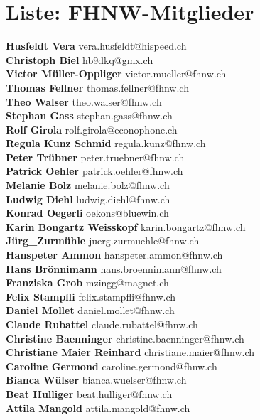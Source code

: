 \documentclass{scrartcl}
\begin{document}
\section*{Liste: FHNW-Mitglieder}
\textbf{Husfeldt Vera } vera.husfeldt@hispeed.ch\\
\textbf{Christoph Biel } hb9dkq@gmx.ch\\
\textbf{Victor Müller-Oppliger } victor.mueller@fhnw.ch\\
\textbf{Thomas Fellner } thomas.fellner@fhnw.ch\\
\textbf{Theo Walser } theo.walser@fhnw.ch\\
\textbf{Stephan Gass } stephan.gass@fhnw.ch\\
\textbf{Rolf Girola } rolf.girola@econophone.ch\\
\textbf{Regula Kunz Schmid } regula.kunz@fhnw.ch\\
\textbf{Peter Trübner } peter.truebner@fhnw.ch\\
\textbf{Patrick Oehler } patrick.oehler@fhnw.ch\\
\textbf{Melanie Bolz } melanie.bolz@fhnw.ch\\
\textbf{Ludwig Diehl } ludwig.diehl@fhnw.ch\\
\textbf{Konrad Oegerli } oekons@bluewin.ch\\
\textbf{Karin Bongartz Weisskopf } karin.bongartz@fhnw.ch\\
\textbf{Jürg_Zurmühle } juerg.zurmuehle@fhnw.ch\\
\textbf{Hanspeter Ammon } hanspeter.ammon@fhnw.ch\\
\textbf{Hans Brönnimann } hans.broennimann@fhnw.ch\\
\textbf{Franziska Grob } mzingg@magnet.ch\\
\textbf{Felix Stampfli } felix.stampfli@fhnw.ch\\
\textbf{Daniel Mollet } daniel.mollet@fhnw.ch\\
\textbf{Claude Rubattel } claude.rubattel@fhnw.ch\\
\textbf{Christine Baenninger } christine.baenninger@fhnw.ch\\
\textbf{Christiane Maier Reinhard } christiane.maier@fhnw.ch\\
\textbf{Caroline Germond } caroline.germond@fhnw.ch\\
\textbf{Bianca Wülser } bianca.wuelser@fhnw.ch\\
\textbf{Beat Hulliger } beat.hulliger@fhnw.ch\\
\textbf{Attila Mangold } attila.mangold@fhnw.ch\\
\end{document}
